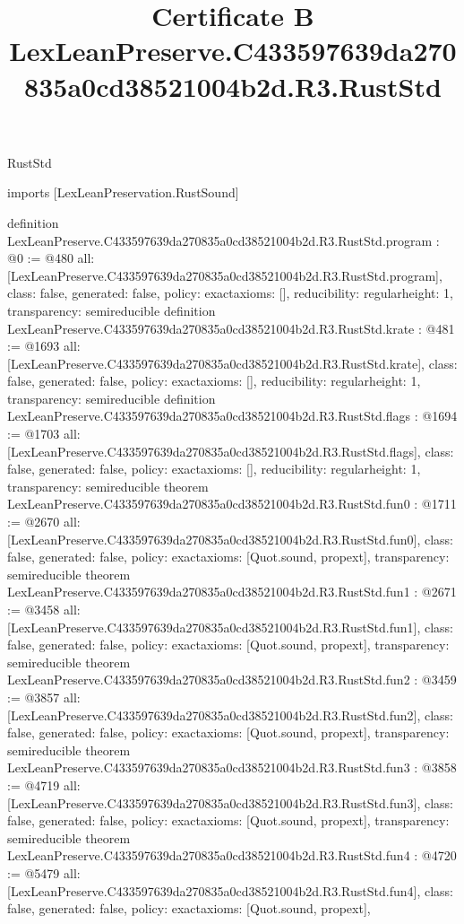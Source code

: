 \begin{lexlean}{RustStd}
\title{Certificate B LexLeanPreserve.C433597639da270835a0cd38521004b2d.R3.RustStd}
\begin{coremodule}
imports [LexLeanPreservation.RustSound]

definition LexLeanPreserve.C433597639da270835a0cd38521004b2d.R3.RustStd.program : @0 := @480 {
  all: [LexLeanPreserve.C433597639da270835a0cd38521004b2d.R3.RustStd.program],
  class: false,
  generated: false,
  policy: exact{axioms: []},
  reducibility: regular{height: 1},
  transparency: semireducible
}
definition LexLeanPreserve.C433597639da270835a0cd38521004b2d.R3.RustStd.krate : @481 := @1693 {
  all: [LexLeanPreserve.C433597639da270835a0cd38521004b2d.R3.RustStd.krate],
  class: false,
  generated: false,
  policy: exact{axioms: []},
  reducibility: regular{height: 1},
  transparency: semireducible
}
definition LexLeanPreserve.C433597639da270835a0cd38521004b2d.R3.RustStd.flags : @1694 := @1703 {
  all: [LexLeanPreserve.C433597639da270835a0cd38521004b2d.R3.RustStd.flags],
  class: false,
  generated: false,
  policy: exact{axioms: []},
  reducibility: regular{height: 1},
  transparency: semireducible
}
theorem LexLeanPreserve.C433597639da270835a0cd38521004b2d.R3.RustStd.fun0 : @1711 := @2670 {
  all: [LexLeanPreserve.C433597639da270835a0cd38521004b2d.R3.RustStd.fun0],
  class: false,
  generated: false,
  policy: exact{axioms: [Quot.sound, propext]},
  transparency: semireducible
}
theorem LexLeanPreserve.C433597639da270835a0cd38521004b2d.R3.RustStd.fun1 : @2671 := @3458 {
  all: [LexLeanPreserve.C433597639da270835a0cd38521004b2d.R3.RustStd.fun1],
  class: false,
  generated: false,
  policy: exact{axioms: [Quot.sound, propext]},
  transparency: semireducible
}
theorem LexLeanPreserve.C433597639da270835a0cd38521004b2d.R3.RustStd.fun2 : @3459 := @3857 {
  all: [LexLeanPreserve.C433597639da270835a0cd38521004b2d.R3.RustStd.fun2],
  class: false,
  generated: false,
  policy: exact{axioms: [Quot.sound, propext]},
  transparency: semireducible
}
theorem LexLeanPreserve.C433597639da270835a0cd38521004b2d.R3.RustStd.fun3 : @3858 := @4719 {
  all: [LexLeanPreserve.C433597639da270835a0cd38521004b2d.R3.RustStd.fun3],
  class: false,
  generated: false,
  policy: exact{axioms: [Quot.sound, propext]},
  transparency: semireducible
}
theorem LexLeanPreserve.C433597639da270835a0cd38521004b2d.R3.RustStd.fun4 : @4720 := @5479 {
  all: [LexLeanPreserve.C433597639da270835a0cd38521004b2d.R3.RustStd.fun4],
  class: false,
  generated: false,
  policy: exact{axioms: [Quot.sound, propext]},
}
\end{coremodule}
\end{lexlean}
